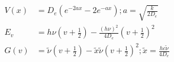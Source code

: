 \begin{align*}
V\left(x\right)&=D_e\left(e^{-2ax}-2e^{-ax}\right); a = \sqrt{\frac{k}{2D_e}}\\
E_v&=h\nu\left(v+\frac{1}{2}\right)-\frac{\left(h\nu\right)^2}{4D_e}\left(v+\frac{1}{2}\right)^2\\
G\left(v\right)&=\tilde{\nu}\left(v+\frac{1}{2}\right)-\tilde{x}\tilde{\nu}\left(v+\frac{1}{2}\right)^2; \tilde{x}=\frac{hc\tilde{\nu}}{4D_e}\\
\end{align*}